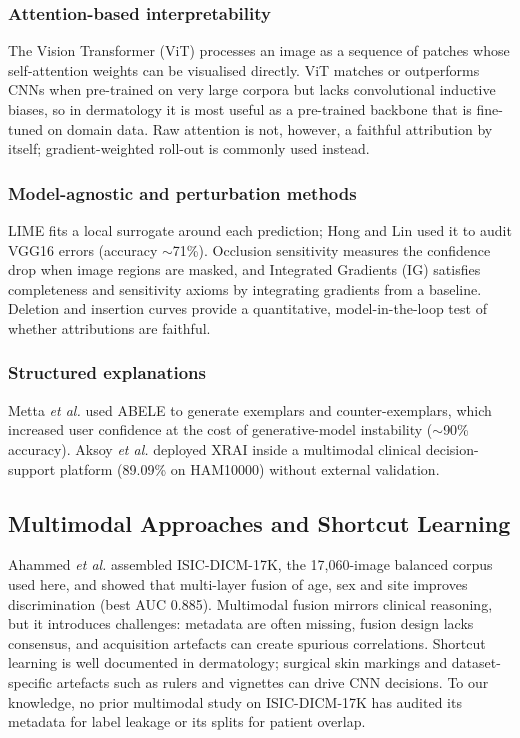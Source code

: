\documentclass[journal]{IEEEtran}
\begin{document}
\subsubsection{Attention-based interpretability}
The Vision Transformer (ViT) \cite{dosovitskiy2021} processes an image as a sequence of patches whose self-attention weights can be visualised directly. ViT matches or outperforms CNNs when pre-trained on very large corpora but lacks convolutional inductive biases, so in dermatology it is most useful as a pre-trained backbone that is fine-tuned on domain data. Raw attention is not, however, a faithful attribution by itself; gradient-weighted roll-out is commonly used instead.

\subsubsection{Model-agnostic and perturbation methods}
LIME \cite{ribeiro2016} fits a local surrogate around each prediction; Hong and Lin \cite{hong2024} used it to audit VGG16 errors (accuracy $\sim$71\%). Occlusion sensitivity \cite{zeiler2014} measures the confidence drop when image regions are masked, and Integrated Gradients (IG) \cite{sundararajan2017} satisfies completeness and sensitivity axioms by integrating gradients from a baseline. Deletion and insertion curves \cite{petsiuk2018} provide a quantitative, model-in-the-loop test of whether attributions are faithful.

\subsubsection{Structured explanations}
Metta \textit{et al.} \cite{metta2024} used ABELE to generate exemplars and counter-exemplars, which increased user confidence at the cost of generative-model instability ($\sim$90\% accuracy). Aksoy \textit{et al.} \cite{aksoy2025} deployed XRAI inside a multimodal clinical decision-support platform (89.09\% on HAM10000) without external validation.

\subsection{Multimodal Approaches and Shortcut Learning}
Ahammed \textit{et al.} \cite{ahammed2025} assembled ISIC-DICM-17K, the 17,060-image balanced corpus used here, and showed that multi-layer fusion of age, sex and site improves discrimination (best AUC 0.885). Multimodal fusion mirrors clinical reasoning, but it introduces challenges: metadata are often missing, fusion design lacks consensus, and acquisition artefacts can create spurious correlations. Shortcut learning \cite{geirhos2020} is well documented in dermatology; surgical skin markings \cite{winkler2019} and dataset-specific artefacts such as rulers and vignettes \cite{bissoto2019} can drive CNN decisions. To our knowledge, no prior multimodal study on ISIC-DICM-17K has audited its metadata for label leakage or its splits for patient overlap.
\end{document}
